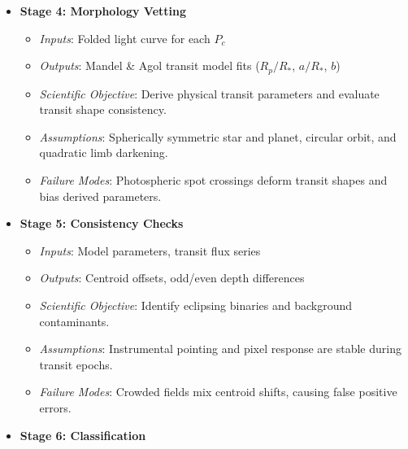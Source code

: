 \begin{itemize}
\begin{itemize}
    \item \textit{Inputs}: TCE, sector-level partitions of $f_{\text{det}}(t)$
    \item \textit{Outputs}: Surviving candidate periods set $\mathcal{P} = \{P_c\}$
    \item \textit{Scientific Objective}: Verify the stability and uniqueness of the period recovery search across independent observation epochs.
    \item \textit{Assumptions}: Transit timings follow a coherent linear ephemeris across all sectors.
    \item \textit{Failure Modes}: Severe Transit Timing Variations (TTVs) or wide data gaps prune valid periods.
    \end{itemize}
\item \textbf{Stage 4: Morphology Vetting}
    \begin{itemize}
    \item \textit{Inputs}: Folded light curve for each $P_c$
    \item \textit{Outputs}: Mandel \& Agol transit model fits ($R_p/R_*$, $a/R_*$, $b$)
    \item \textit{Scientific Objective}: Derive physical transit parameters and evaluate transit shape consistency.
    \item \textit{Assumptions}: Spherically symmetric star and planet, circular orbit, and quadratic limb darkening.
    \item \textit{Failure Modes}: Photospheric spot crossings deform transit shapes and bias derived parameters.
    \end{itemize}
\item \textbf{Stage 5: Consistency Checks}
    \begin{itemize}
    \item \textit{Inputs}: Model parameters, transit flux series
    \item \textit{Outputs}: Centroid offsets, odd/even depth differences
    \item \textit{Scientific Objective}: Identify eclipsing binaries and background contaminants.
    \item \textit{Assumptions}: Instrumental pointing and pixel response are stable during transit epochs.
    \item \textit{Failure Modes}: Crowded fields mix centroid shifts, causing false positive errors.
    \end{itemize}
\item \textbf{Stage 6: Classification}

\end{itemize}

